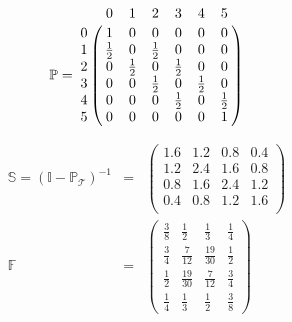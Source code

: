 \begin{example}
\begin{figure}[htp]
\centering
{}
\end{figure}

\begin{multicols}{2}
\[ \mathbb{P} = \bordermatrix{
    & 0 & 1 & 2 & 3 & 4 & 5 \cr
  0 & 1 & 0 & 0 & 0 & 0 & 0 \cr
  1 & \frac{1}{2} & 0 & \frac{1}{2} & 0 & 0 & 0 \cr
  2 & 0 & \frac{1}{2} & 0 & \frac{1}{2} & 0 & 0 \cr
  3 & 0 & 0 & \frac{1}{2} & 0 & \frac{1}{2} & 0 \cr
  4 & 0 & 0 & 0 & \frac{1}{2} & 0 & \frac{1}{2} \cr
  5 & 0 & 0 & 0 & 0 & 0 & 1 \cr
} \]

\null \vfill
\null \vfill
\begin{eqnarray*}
\mathbb{S} = (\mathbb{I} - \mathbb{P}_{\mathcal{T}})^{-1} & = & \begin{pmatrix}
  1.6 & 1.2 & 0.8 & 0.4 \\
  1.2 & 2.4 & 1.6 & 0.8 \\
  0.8 & 1.6 & 2.4 & 1.2 \\
  0.4 & 0.8 & 1.2 & 1.6 \\
\end{pmatrix} \\
\mathbb{F} & = & \begin{pmatrix}
  \frac{3}{8} & \frac{1}{2}     & \frac{1}{3}     & \frac{1}{4} \\
  \frac{3}{4} & \frac{7}{12}  & \frac{19}{30}   & \frac{1}{2} \\
  \frac{1}{2} & \frac{19}{30}   & \frac{7}{12}  & \frac{3}{4} \\
  \frac{1}{4} & \frac{1}{3}     & \frac{1}{2}     & \frac{3}{8}
\end{pmatrix}
\end{eqnarray*}
\end{multicols}
\end{example}